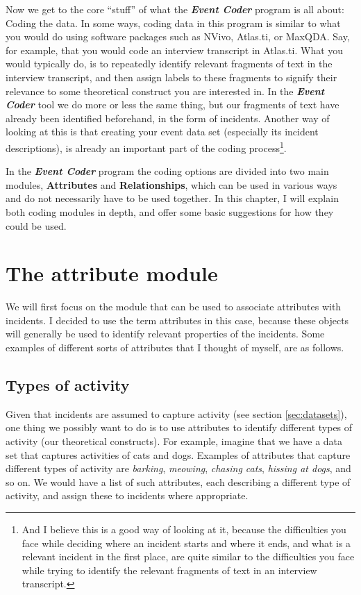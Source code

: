 \documentclass{memoir}
\begin{document}
Now we get to the core ``stuff'' of what the \textbf{\emph{Event Coder}} program is all about: Coding the data. In some ways, coding data in this program is similar to what you would do using software packages such as NVivo, Atlas.ti, or MaxQDA. Say, for example, that you would code an interview transcript in Atlas.ti. What you would typically do, is to repeatedly identify relevant fragments of text in the interview transcript, and then assign labels to these fragments to signify their relevance to some theoretical construct you are interested in. In the \textbf{\emph{Event Coder}} tool we do more or less the same thing, but our fragments of text have already been identified beforehand, in the form of incidents. Another way of looking at this is that creating your event data set (especially its incident descriptions), is already an important part of the coding process\footnote{And I believe this is a good way of looking at it, because the difficulties you face while deciding where an incident starts and where it ends, and what is a relevant incident in the first place, are quite similar to the difficulties you face while trying to identify the relevant fragments of text in an interview transcript.}. 

In the \textbf{\emph{Event Coder}} program the coding options are divided into two main modules, \textbf{Attributes} and \textbf{Relationships}, which can be used in various ways and do not necessarily have to be used together. In this chapter, I will explain both coding modules in depth, and offer some basic suggestions for how they could be used.

\section{The attribute module}
\label{sec:attributemodule}

We will first focus on the module that can be used to associate attributes with incidents. I decided to use the term attributes in this case, because these objects will generally be used to identify relevant properties of the incidents. Some examples of different sorts of attributes that I thought of myself, are as follows.

\subsection{Types of activity}
\label{sec:types of activity}


Given that incidents are assumed to capture activity (see section \ref{sec:datasets}), one thing we possibly want to do is to use attributes to identify different types of activity (our theoretical constructs). For example, imagine that we have a data set that captures activities of cats and dogs. Examples of attributes that capture different types of activity are \emph{barking}, \emph{meowing}, \emph{chasing cats}, \emph{hissing at dogs}, and so on. We would have a list of such attributes, each describing a different type of activity, and assign these to incidents where appropriate.
\end{document}
